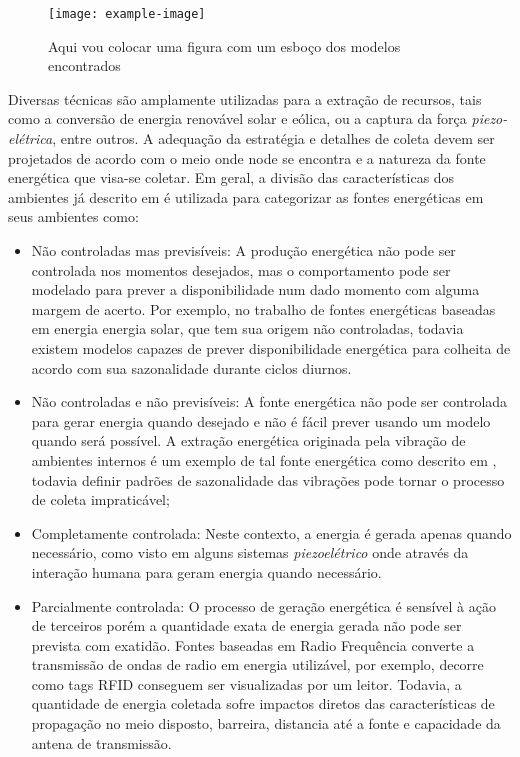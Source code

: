 \begin{figure}[h]
\noindent\texttt{[image: example-image]} 
\caption{Aqui vou colocar uma figura com um esboço dos modelos encontrados}
\centering
\end{figure}

Diversas técnicas são amplamente utilizadas para a extração de recursos, tais como a conversão de energia renovável solar e eólica, ou a captura da força \textit{piezo-elétrica}, entre outros. A adequação da estratégia e detalhes de coleta devem ser projetados de acordo com o meio onde node se encontra e a natureza da fonte energética que visa-se coletar. Em geral, a divisão das características dos ambientes já descrito em \cite{kansal_power_2007} é utilizada para categorizar as fontes energéticas em seus ambientes como:

\begin{itemize}

    \item Não controladas mas previsíveis: A produção energética não pode ser controlada nos momentos desejados, mas o comportamento pode ser modelado para prever a disponibilidade num dado momento com alguma margem de acerto. Por exemplo, no trabalho de  \cite{lee_energy_2018} fontes energéticas baseadas em energia energia solar, que tem sua origem não controladas, todavia existem modelos capazes de prever  disponibilidade energética para colheita de acordo com sua sazonalidade durante ciclos diurnos.
    
    \item Não controladas e não previsíveis: A fonte energética não pode ser controlada para gerar energia quando desejado e não é fácil prever usando um modelo quando será possível. A extração energética originada pela vibração de ambientes internos é um exemplo de tal fonte energética como descrito em \cite{wei_comprehensive_2017}, todavia definir padrões de sazonalidade das vibrações pode tornar o processo de coleta impraticável;
    
    \item Completamente controlada: Neste contexto, a energia é gerada apenas quando necessário, como visto em alguns sistemas \textit{piezoelétrico} onde através da interação humana para geram energia quando necessário.
    
    \item Parcialmente controlada: O processo de geração energética é sensível à ação de terceiros porém a quantidade exata de energia gerada não pode ser prevista com exatidão. Fontes baseadas em Radio Frequência converte a transmissão de ondas de radio em energia utilizável, por exemplo, \cite{shaikh_energy_2016} decorre como tags \acf{RFID} conseguem ser visualizadas por um leitor. Todavia, a quantidade de energia coletada sofre impactos diretos das características de propagação no meio disposto, barreira, distancia até a fonte e capacidade da antena de transmissão.
\end{itemize}

